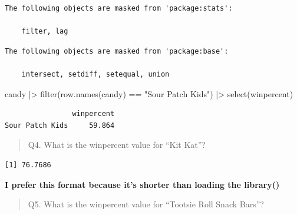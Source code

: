 \documentclass[
  letterpaper,
  DIV=11,
  numbers=noendperiod]{scrartcl}
\newenvironment{Shaded}{\begin{snugshade}}{\end{snugshade}}
\newcommand{\FunctionTok}[1]{\textcolor[rgb]{0.28,0.35,0.67}{#1}}
\newcommand{\NormalTok}[1]{\textcolor[rgb]{0.00,0.23,0.31}{#1}}
\newcommand{\SpecialCharTok}[1]{\textcolor[rgb]{0.37,0.37,0.37}{#1}}
\newcommand{\StringTok}[1]{\textcolor[rgb]{0.13,0.47,0.30}{#1}}
\begin{document}
\begin{verbatim}
The following objects are masked from 'package:stats':

    filter, lag
\end{verbatim}

\begin{verbatim}
The following objects are masked from 'package:base':

    intersect, setdiff, setequal, union
\end{verbatim}

\begin{Shaded}
\begin{Highlighting}[]
\NormalTok{candy }\SpecialCharTok{|\textgreater{}} \FunctionTok{filter}\NormalTok{(}\FunctionTok{row.names}\NormalTok{(candy) }\SpecialCharTok{==} \StringTok{"Sour Patch Kids"}\NormalTok{) }\SpecialCharTok{|\textgreater{}}
  \FunctionTok{select}\NormalTok{(winpercent)}
\end{Highlighting}
\end{Shaded}

\begin{verbatim}
                winpercent
Sour Patch Kids     59.864
\end{verbatim}

\begin{quote}
Q4. What is the winpercent value for ``Kit Kat''?
\end{quote}

\begin{Shaded}
\end{Shaded}

\begin{verbatim}
[1] 76.7686
\end{verbatim}

\textbf{I prefer this format because it's shorter than loading the
library()}

\begin{quote}
Q5. What is the winpercent value for ``Tootsie Roll Snack Bars''?
\end{quote}

\begin{Shaded}
\end{Shaded}
\end{document}
